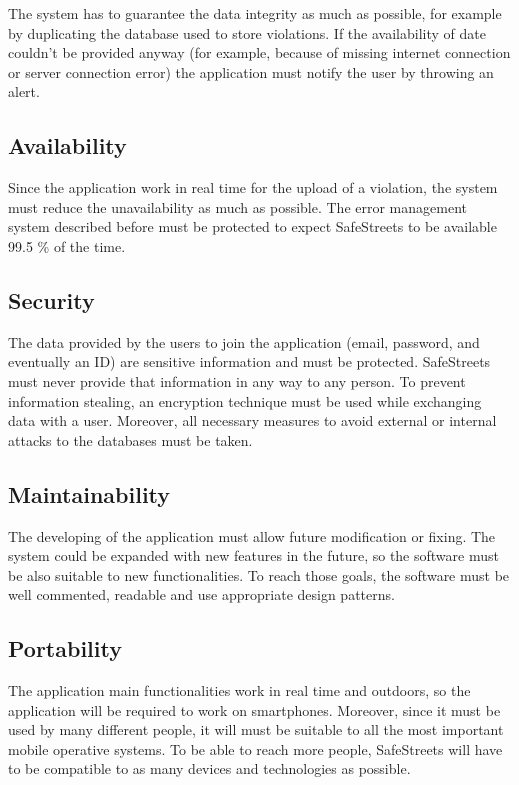 \documentclass[../RASD.tex]{subfiles}
\begin{document}
            The system has to guarantee the data integrity as much as possible, for example by duplicating the database used to store violations.
            If the availability of date couldn’t be provided anyway (for example, because of missing internet connection or server connection error)
            the application must notify the user by throwing an alert.
            \subsection{Availability}\label{subsec:availability}
            Since the application work in real time for the upload of a violation, the system must reduce the unavailability as much as possible.
            The error management system described before must be protected to expect SafeStreets to be available 99.5 \% of the time.
            \subsection{Security}\label{subsec:security}
            The data provided by the users to join the application (email, password, and eventually an ID) are sensitive information and must be protected.
            SafeStreets must never provide that information in any way to any person. To prevent information stealing, an encryption technique must be used
            while exchanging data with a user. Moreover, all necessary measures to avoid external or internal attacks to the databases must be taken.
            \subsection{Maintainability}\label{subsec:maintainability}
            The developing of the application must allow future modification or fixing. The system could be expanded with new features in the future,
            so the software must be also suitable to new functionalities. To reach those goals, the software must be well commented, readable and use appropriate design patterns.
            \subsection{Portability}\label{subsec:portability}
            The application main functionalities work in real time and outdoors, so the application will be required to work on smartphones.
            Moreover, since it must be used by many different people, it will must be suitable to all the most important mobile operative systems.
            To be able to reach more people, SafeStreets will have to be compatible to as many devices and technologies as possible.
\end{document}
